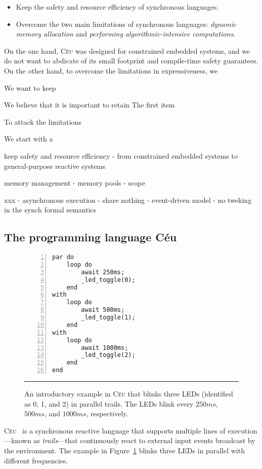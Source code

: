 \documentclass[pdftex,12pt,a4paper]{article}
\newcommand{\CEU}{\textsc{C\'{e}u}\xspace}
\begin{document}
\begin{itemize}
    \item Keep the safety and resource efficiency of synchronous languages.
    \item Overcome the two main limitations of synchronous languages:
            \emph{dynamic memory allocation}
            and
            \emph{performing algorithmic-intensive computations}.
\end{itemize}

On the one hand, \CEU was designed for constrained embedded systems, and we do 
not want to abdicate of its small footprint and compile-time safety guarantees.
%
On the other hand, to overcome the limitations in expressiveness, we

We want to keep

We believe that it is important to retain
The first item

To attack the limitations

We start with a

keep safety and resource efficiency
    - from constrained embedded systems to general-purpose reactive systems

memory management
    - memory pools
    - scope

xxx
    - asynchronous execution
        - share nothing
        - event-driven model
        - no tweking in the synch formal semantics

\subsection{The programming language C\'eu}

\begin{figure}[t]
\begin{lstlisting}[numbers=left,xleftmargin=3em]
par do
    loop do
        await 250ms;
        _led_toggle(0);
    end
with
    loop do
        await 500ms;
        _led_toggle(1);
    end
with
    loop do
        await 1000ms;
        _led_toggle(2);
    end
end
\end{lstlisting}
\rule{8.6cm}{0.37pt}
\caption{
    An introductory example in \CEU that blinks three LEDs (identified as 0, 1, 
    and 2) in parallel trails.
    The LEDs blink every $250ms$, $500ms$, and $1000ms$, respectively.
    \label{lst.blink}
}
\end{figure}

\CEU~\cite{ceu.sensys13,ceu.phd,ceu.rem13,ceu.tr} is a synchronous reactive 
language that supports multiple lines of execution---known as 
\emph{trails}---that continuously react to external input events broadcast by 
the environment.
%
The example in Figure~\ref{lst.blink} blinks three LEDs in parallel with 
different frequencies.
\end{document}
